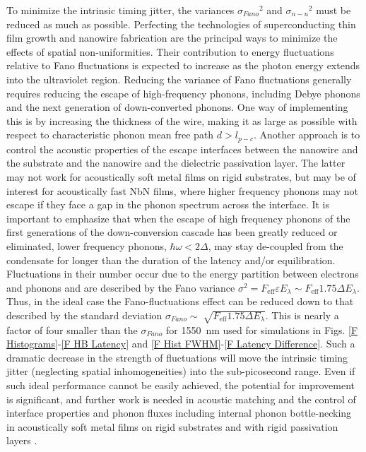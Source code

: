 \documentclass[%
reprint,
 amsmath,amssymb,
aps,
pra,
]{revtex4-1}
\begin{document}
\quad To minimize the intrinsic timing jitter, the variances \({\sigma_{Fano}}^2\) and \({\sigma_{n-u}}^2\) must be reduced as much as possible.  Perfecting the technologies of superconducting thin film growth and nanowire fabrication are the principal ways to minimize the effects of spatial non-uniformities.  Their contribution to energy fluctuations relative to Fano fluctuations is expected to increase as the photon energy extends into the ultraviolet region.  Reducing the variance of Fano fluctuations generally requires reducing the escape of high-frequency phonons, including Debye phonons and the next generation of down-converted phonons. One way of implementing this is by increasing the thickness of the wire, making it as large as possible with respect to characteristic phonon mean free path \(d > l_{p-c} \).  Another approach is to control the acoustic properties of the escape interfaces between the nanowire and the substrate and the nanowire and the dielectric passivation layer. The latter may not work for acoustically soft metal films on rigid substrates, but may be of interest for acoustically fast NbN films, where higher frequency phonons may not escape if they face a gap in the phonon spectrum across the interface. It is important to emphasize that when the escape of high frequency phonons of the first generations of the down-conversion cascade has been greatly reduced or eliminated, lower frequency phonons, \(\hbar\omega<2\Delta\), may stay de-coupled from the condensate for longer than the duration of the latency and/or equilibration. Fluctuations in their number occur due to the energy partition between electrons and phonons and are described by the Fano variance \(\sigma^2 = F_{\text{eff}} \varepsilon E_{\lambda} \sim F_{\text{eff}} 1.75 \Delta E_{\lambda}\). Thus, in the ideal case the Fano-fluctuations effect can be reduced down to that described by the standard deviation \(\sigma_{Fano} \sim \sqrt[]{F_{\text{eff}} 1.75\Delta E_{\lambda}}\). This is nearly a factor of four smaller than the \(\sigma_{Fano}\) for 1550~nm used for simulations in Figs. \ref{F Histograms}-\ref{F HB Latency} and \ref{F Hist FWHM}-\ref{F Latency Difference}.  Such a dramatic decrease in the strength of fluctuations will move the intrinsic timing jitter (neglecting spatial inhomogeneities) into the sub-picosecond range.  Even if such ideal performance cannot be easily achieved, the potential for improvement is significant, and further work is needed in acoustic matching and the control of interface properties and phonon fluxes including internal phonon bottle-necking in acoustically soft metal films on rigid substrates and with rigid passivation layers \cite{sidorova_electron-phonon_2016}.    
\end{document}
